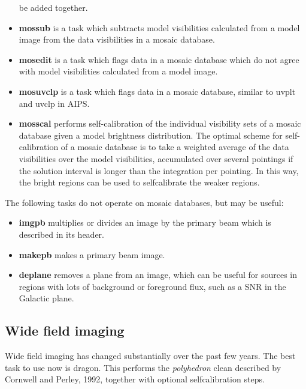 \begin{itemize}
	be added together.
\item {\bf mossub} is a task which subtracts model visibilities calculated from a
	model image from the data visibilities in a mosaic database.
\item {\bf mosedit} is a task which flags data in a mosaic database which do not
	agree with model visibilities calculated from a model image.
\item {\bf mosuvclp} is a task which flags data in a mosaic database, similar to
	uvplt and uvclp in AIPS.
\item {\bf mosscal} performs self-calibration of the individual visibility sets of
	a mosaic database given a model brightness distribution.  The optimal scheme
	for self-calibration of a mosaic database is to take a weighted average of
	the data visibilities over the model visibilities, accumulated over several
	pointings if the solution interval is longer than the integration per pointing.
	In this way, the bright regions can be used to selfcalibrate the weaker regions.
\end{itemize}
The following tasks do not operate on mosaic databases, but may be useful:
\begin{itemize}
\item {\bf imgpb} multiplies or divides an image by the primary beam which is
	described in its header.
\item {\bf makepb} makes a primary beam image.
\item {\bf deplane} removes a plane from an image, which can be useful for sources
	in regions with lots of background or foreground flux, such as a SNR in the
	Galactic plane.
\end{itemize}

\subsection{Wide field imaging}

Wide field imaging has changed substantially over the past few years.
The best task to use now is dragon. This performs the {\em polyhedron}
clean described by Cornwell and Perley, 1992, together with optional
selfcalibration steps.

